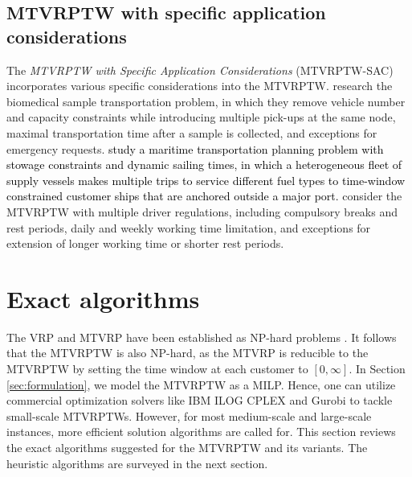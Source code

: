 \documentclass[11pt]{article}
\newcommand\addb[1]{\textcolor{black}{#1}}
\begin{document}
\subsection{MTVRPTW with specific application considerations}

The \textit{MTVRPTW with Specific Application Considerations} (MTVRPTW-SAC) incorporates various specific considerations into the MTVRPTW.  \cite{anaya2016biomedical} research the biomedical sample transportation problem, in which they remove vehicle number and capacity constraints while introducing multiple pick-ups at the same node, maximal transportation time after a sample is collected, and exceptions for emergency requests.  \addb{\cite{christiansen2017operational} study a maritime transportation planning problem with stowage constraints and dynamic sailing times, in which a heterogeneous fleet of supply vessels makes multiple trips to service different fuel types to time-window constrained customer ships that are anchored outside a major port.}  \cite{benkebir2019multi} consider the MTVRPTW with multiple driver regulations, including compulsory breaks and rest periods, daily and weekly working time limitation, and exceptions for extension of longer working time or shorter rest periods.




\section{Exact algorithms}
\label{sec:exact}

The VRP and MTVRP have been established as NP-hard problems \citep[see, e.g.,][]{lenstra1981complexity, olivera2007adaptive}. 
 It follows that the MTVRPTW is also NP-hard, as the MTVRP is reducible to the MTVRPTW by setting the time window at each customer to $[0, \infty]$.  In Section \ref{sec:formulation}, we model the MTVRPTW as a MILP.  Hence, one can utilize commercial optimization solvers like IBM ILOG CPLEX and Gurobi to tackle small-scale MTVRPTWs.  However, for most medium-scale and large-scale instances, more efficient solution algorithms are called for.  This section reviews the exact algorithms suggested for the MTVRPTW and its variants.  The heuristic algorithms are surveyed in the next section.
\newline
\end{document}
